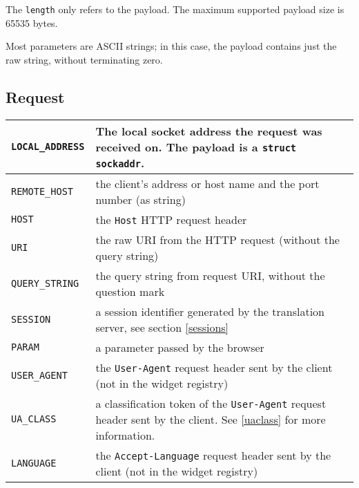 \documentclass[a4paper,12pt]{article}
\begin{document}
The \texttt{length} only refers to the payload.  The maximum supported
payload size is 65535 bytes.

Most parameters are ASCII strings; in this case, the payload contains
just the raw string, without terminating zero.

\subsection{Request}

\begin{longtable}{|l|p{10cm}|}
\hline

\verb|LOCAL_ADDRESS| & The local socket address the request was
received on.  The payload is a \texttt{struct sockaddr}. \\

\hline

\verb|REMOTE_HOST| & the client's address or host name and the port
number (as string) \\

\hline
\verb|HOST| & the \texttt{Host} HTTP request header \\
\hline
\verb|URI| & the raw URI from the HTTP request (without the query
string) \\
\hline

\verb|QUERY_STRING| & the query string from request URI, without
the question mark \\

\hline
\verb|SESSION| & a session identifier generated by the translation
server, see section \ref{sessions} \\
\hline
\verb|PARAM| & a parameter passed by the browser \\

\hline

\verb|USER_AGENT| & the \texttt{User-Agent} request header sent by
the client (not in the widget registry) \\

\hline

\verb|UA_CLASS| & a classification token of the \texttt{User-Agent}
request header sent by the client.  See \ref{uaclass} for more
information. \\

\hline

\verb|LANGUAGE| & the \texttt{Accept-Language} request header sent
by the client (not in the widget registry) \\

\hline


\end{longtable}
\end{document}
